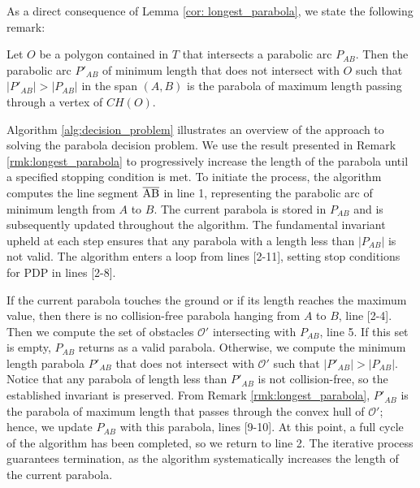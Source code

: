 As a direct consequence of Lemma \ref{cor: longest_parabola}, we state the following remark:
\begin{remark}
\label{rmk:longest_parabola} 
Let $O$ be a polygon
contained in $T$ that intersects a parabolic arc $P_{AB}$. 
Then the parabolic arc $P'_{AB}$ of minimum length that does not intersect with $O$ such that $|P'_{AB}|>|P_{AB}|$ in the span $(A, B)$ is the parabola of maximum length passing through a vertex of $CH(O)$.
\end{remark}

Algorithm \ref{alg:decision_problem} illustrates an overview of the approach to solving the parabola decision problem. We use the result presented in Remark \ref{rmk:longest_parabola} to progressively increase the length of the parabola until a specified stopping condition is met. To initiate the process, the algorithm computes the line segment $\overline{\rm AB}$ in line 1, representing the parabolic arc of minimum length from $A$ to $B$. The %
current parabola is stored in $P_{AB}$ and is subsequently updated throughout the algorithm. 
The fundamental invariant upheld at each step ensures that any parabola with a length less than 
$|P_{AB}|$ is not valid.
The algorithm enters a loop from lines [2-11], setting stop conditions for PDP in lines [2-8].

If the current parabola touches the ground or if its length reaches the maximum value, then there is no collision-free parabola hanging from $A$ to $B$, line [2-4]. Then we compute the set of obstacles $\mathcal{O'}$ intersecting with $P_{AB}$, line 5. If this set is empty, $P_{AB}$ returns as a valid parabola. Otherwise, we compute the minimum length parabola $P'_{AB}$ that does not intersect with $\mathcal{O'}$ such that $|P'_{AB}|>|P_{AB}|$. Notice that any parabola of length less than $P'_{AB}$ is not collision-free, so the established invariant is preserved. From Remark \ref{rmk:longest_parabola}, $P'_{AB}$ is the parabola of maximum length that passes through the convex hull of $\mathcal{O'}$; hence, we update $P_{AB}$ with this parabola, lines [9-10]. At this point, a full cycle of the algorithm has been completed, so we return to line 2. The iterative process guarantees termination, as the algorithm systematically increases the length of the current parabola.


